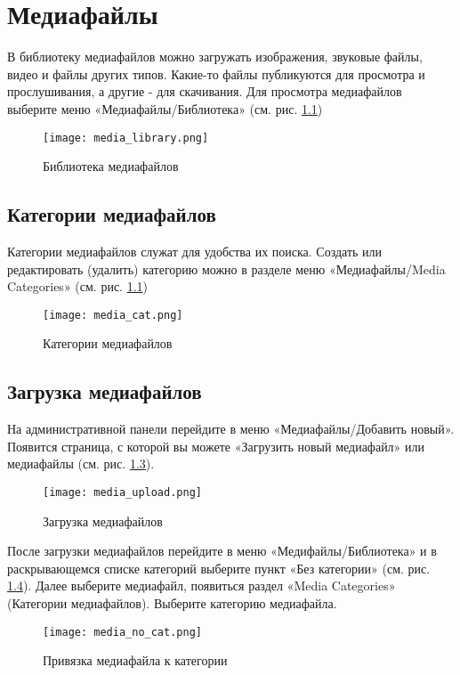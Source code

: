 \chapter{Медиафайлы}
\label{sec:chapter_media}

В библиотеку медиафайлов можно загружать изображения, звуковые файлы, видео и файлы других типов. Какие-то файлы публикуются для просмотра и прослушивания, а другие - для скачивания.
Для просмотра медиафайлов выберите меню «Медиафайлы/Библиотека» (см. рис. \ref{fig:pic_media_library})

\begin{figure}[htp]
    \centering
	\texttt{[image: media\_library.png]}
    \caption{Библиотека медиафайлов}
    \label{fig:pic_media_library}
\end{figure}


\section{Категории медиафайлов}
\label{sec:part_cat_media}

Категории медиафайлов служат для удобства их поиска.
Создать или редактировать (удалить) категорию можно в разделе меню «Медиафайлы/Media Categories» (см. рис. \ref{fig:pic_media_library})

\begin{figure}[htp]
    \centering
	\texttt{[image: media\_cat.png]}
    \caption{Категории медиафайлов}
    \label{fig:pic_media_cat}
\end{figure}

\section{Загрузка медиафайлов}
\label{sec:part_upload}

На административной панели перейдите в меню «Медиафайлы/Добавить новый».
Появится страница, с которой вы можете «Загрузить новый медиафайл» или медиафайлы (см. рис. \ref{fig:pic_media_upload}).

\begin{figure}[htp]
    \centering
	\texttt{[image: media\_upload.png]}
    \caption{Загрузка медиафайлов}
    \label{fig:pic_media_upload}
\end{figure}

После загрузки медиафайлов перейдите в меню «Медифайлы/Библиотека» и в раскрывающемся списке категорий выберите пункт «Без категории» (см. рис. \ref{fig:pic_media_no_cat}). Далее выберите медиафайл, появиться раздел «Media Categories» (Категории медиафайлов). Выберите категорию медиафайла.

\begin{figure}[htp]
    \centering
	\texttt{[image: media\_no\_cat.png]}
    \caption{Привязка медиафайла к категории}
    \label{fig:pic_media_no_cat}
\end{figure}

